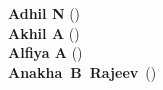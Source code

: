 \noindent \begin{minipage}{0.40\linewidth}
\begin{flushleft}
\collegetown \\
\date
\end{flushleft} 
\end{minipage}
\hfill
\begin{minipage}{0.56\linewidth}
\begin{center}
\begin{minipage}{0.64\linewidth}
\raggedright
\hspace*{0.55cm}\textbf{Adhil N} (\rollnoA) \\[4pt]
\hspace*{0.55cm}\textbf{Akhil A} (\rollnoB) \\[4pt]
\hspace*{0.55cm}\textbf{Alfiya A} (\rollnoC) \\[4pt]
\hspace*{0.55cm}\mbox{\textbf{Anakha B Rajeev} (\rollnoD)}
\end{minipage}
\end{center}
\end{minipage}

\thispagestyle{empty}
